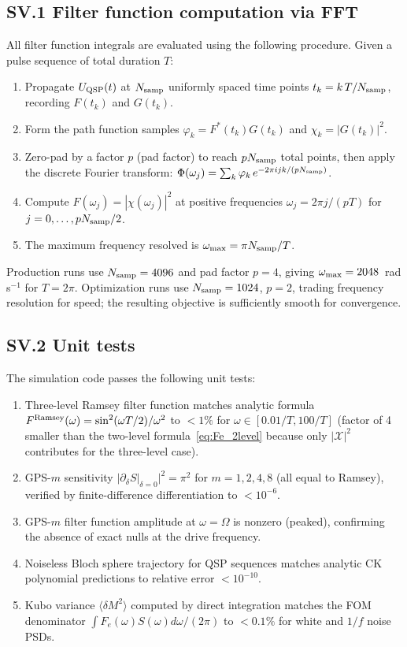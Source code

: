 \documentclass[aps,pra,twocolumn,superscriptaddress,longbibliography]{revtex4-2}
\begin{document}
\subsection*{SV.1 Filter function computation via FFT}

All filter function integrals are evaluated using the following procedure.
Given a pulse sequence of total duration $T$:
\begin{enumerate}
  \item Propagate $U_{\rm QSP}(t)$ at $N_{\rm samp}$ uniformly spaced time points
        $t_k = k\,T/N_{\rm samp}$, recording $F(t_k)$ and $G(t_k)$.
  \item Form the path function samples $\varphi_k = F^*(t_k)G(t_k)$ and
        $\chi_k = |G(t_k)|^2$.
  \item Zero-pad by a factor $p$ (pad factor) to reach $pN_{\rm samp}$ total points,
        then apply the discrete Fourier transform:
        $\Phi(\omega_j) = \sum_k \varphi_k\,e^{-2\pi ijk/(pN_{\rm samp})}$.
  \item Compute $F(\omega_j) = |\chi(\omega_j)|^2$
        at positive frequencies $\omega_j = 2\pi j/(pT)$ for $j=0,\ldots,pN_{\rm samp}/2$.
  \item The maximum frequency resolved is $\omega_{\rm max} = \pi N_{\rm samp}/T$.
\end{enumerate}
Production runs use $N_{\rm samp} = 4096$ and pad factor $p=4$, giving
$\omega_{\rm max} = 2048$~rad\,s$^{-1}$ for $T = 2\pi$.
Optimization runs use $N_{\rm samp} = 1024$, $p=2$, trading frequency resolution
for speed; the resulting objective is sufficiently smooth for convergence.

\subsection*{SV.2 Unit tests}

The simulation code passes the following unit tests:
\begin{enumerate}
  \item Three-level Ramsey filter function matches analytic formula
        $F^{\rm Ramsey}(\omega) = \sin^2(\omega T/2)/\omega^2$ to $<1\%$
        for $\omega \in [0.01/T, 100/T]$ (factor of 4 smaller than the
        two-level formula~\eqref{eq:Fe_2level} because only $|\mathcal{X}|^2$
        contributes for the three-level case).
  \item GPS-$m$ sensitivity $|\partial_\delta S|_{\delta=0}|^2 = \pi^2$ for $m = 1, 2, 4, 8$
        (all equal to Ramsey), verified by finite-difference differentiation to $<10^{-6}$.
  \item GPS-$m$ filter function amplitude at $\omega = \Omega$ is nonzero (peaked),
        confirming the absence of exact nulls at the drive frequency.
  \item Noiseless Bloch sphere trajectory for QSP sequences matches analytic
        CK polynomial predictions to relative error $< 10^{-10}$.
  \item Kubo variance $\langle\delta M^2\rangle$ computed by direct integration
        matches the FOM denominator $\int F_e(\omega)S(\omega)d\omega/(2\pi)$
        to $<0.1\%$ for white and $1/f$ noise PSDs.
\end{enumerate}
\end{document}
